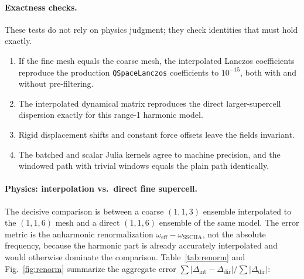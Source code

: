 \documentclass[11pt,a4paper]{article}
\begin{document}
\paragraph{Exactness checks.}
These tests do not rely on physics judgment; they check identities that must
hold exactly.
\begin{enumerate}
\item If the fine mesh equals the coarse mesh, the interpolated Lanczos
coefficients reproduce the production \texttt{QSpaceLanczos} coefficients to
$10^{-15}$, both with and without pre-filtering.
\item The interpolated dynamical matrix reproduces the direct
larger-supercell dispersion exactly for this range-1 harmonic model.
\item Rigid displacement shifts and constant force offsets leave the fields
invariant.
\item The batched and scalar Julia kernels agree to machine precision, and
the windowed path with trivial windows equals the plain path identically.
\end{enumerate}

\paragraph{Physics: interpolation vs.\ direct fine supercell.}
The decisive comparison is between a coarse $(1,1,3)$ ensemble interpolated
to the $(1,1,6)$ mesh and a direct $(1,1,6)$ ensemble of the same model.
The error metric is the anharmonic renormalization
$\omega_{\mathrm{eff}}-\omega_{\mathrm{SSCHA}}$, not the absolute
frequency, because the harmonic part is already accurately interpolated and
would otherwise dominate the comparison.
Table~\ref{tab:renorm} and Fig.~\ref{fig:renorm} summarize the aggregate
error $\sum|\Delta_{\mathrm{int}} - \Delta_{\mathrm{dir}}| /
\sum|\Delta_{\mathrm{dir}}|$:
\end{document}
